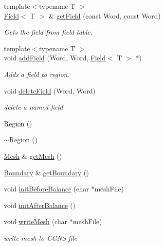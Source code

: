 \begin{DoxyCompactItemize}
{\footnotesize template$<$typename T $>$ }\\\hyperlink{classHSF_1_1Field}{Field}$<$ T $>$ \& \hyperlink{classHSF_1_1Region_a2fc8f3916190395f4b43547755113c8e}{getField} (const Word, const Word)
\begin{DoxyCompactList}\small\item\em Gets the field from field table. \item\end{DoxyCompactList}\item 
{\footnotesize template$<$typename T $>$ }\\void \hyperlink{classHSF_1_1Region_aec3f0520f9618a0e0d92a5c2a102b980}{addField} (Word, Word, \hyperlink{classHSF_1_1Field}{Field}$<$ T $>$ $\ast$)
\begin{DoxyCompactList}\small\item\em Adds a field to region. \item\end{DoxyCompactList}\item 
void \hyperlink{classHSF_1_1Region_ab74797105c6eaf54c3d5101a919d15b6}{deleteField} (Word, Word)
\begin{DoxyCompactList}\small\item\em delete a named field \item\end{DoxyCompactList}\item 
\hyperlink{classHSF_1_1Region_aa31738c265f5192d61a8a7b8f89c972a}{Region} ()
\item 
\hyperlink{classHSF_1_1Region_addfd3a382c30688582a760a25a2d8cbc}{$\sim$Region} ()
\item 
\hyperlink{classHSF_1_1Mesh}{Mesh} \& \hyperlink{classHSF_1_1Region_ab8349c21da1ed2153d3f0906dd571302}{getMesh} ()
\item 
\hyperlink{classHSF_1_1Boundary}{Boundary} \& \hyperlink{classHSF_1_1Region_aa887ee45c20b3b65acc17693d8cb4c45}{getBoundary} ()
\item 
void \hyperlink{classHSF_1_1Region_a9c38c5fc0d2fa5680eda4ab6a6933e4f}{initBeforeBalance} (char $\ast$meshFile)
\item 
void \hyperlink{classHSF_1_1Region_adb2b4937aae6fff73189a039b25eccfd}{initAfterBalance} ()
\item 
void \hyperlink{classHSF_1_1Region_a26f134480b539676bf18b26a96434c89}{writeMesh} (char $\ast$meshFile)
\begin{DoxyCompactList}\small\item\em write mesh to CGNS file \item\end{DoxyCompactList}\item 

\end{DoxyCompactItemize}
